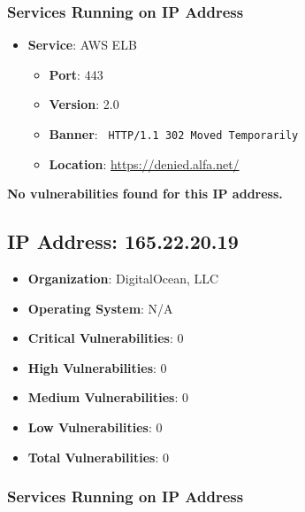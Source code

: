 \documentclass{article}
\begin{document}
\subsubsection*{Services Running on IP Address}

\begin{itemize}
    
        \item \textbf{Service}: AWS ELB
        \begin{itemize}
            \item \textbf{Port}: 443
            \item \textbf{Version}:  2.0 
            \item \textbf{Banner}: \texttt{
                HTTP/1.1 302 Moved Temporarily
            }
            \item \textbf{Location}: \href{ https://denied.alfa.net/ }{ https://denied.alfa.net/ }
        \end{itemize}
    
\end{itemize}


\textbf{No vulnerabilities found for this IP address.}




\clearpage



\subsection*{IP Address: 165.22.20.19}

\begin{itemize}
    \item \textbf{Organization}: DigitalOcean, LLC
    \item \textbf{Operating System}:  N/A 
    \item \textbf{Critical Vulnerabilities}: 0
    \item \textbf{High Vulnerabilities}: 0
    \item \textbf{Medium Vulnerabilities}: 0
    \item \textbf{Low Vulnerabilities}: 0
    \item \textbf{Total Vulnerabilities}: 0
\end{itemize}

\subsubsection*{Services Running on IP Address}
\end{document}
